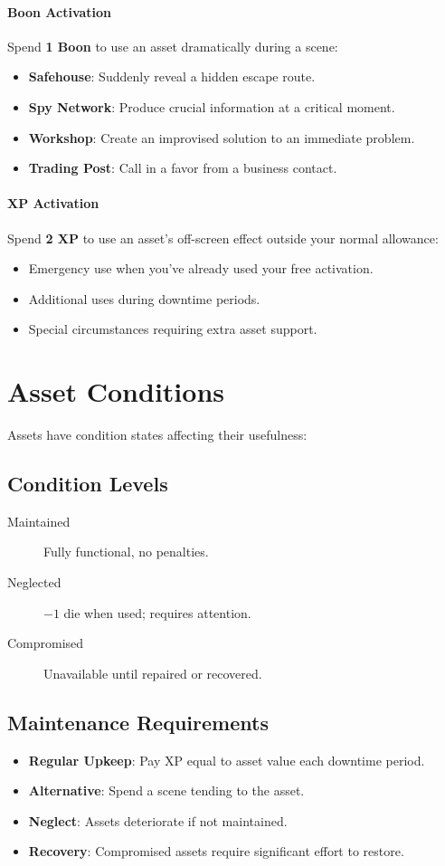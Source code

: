 \paragraph{Boon Activation}
Spend \textbf{1 Boon} to use an asset dramatically during a scene:
\begin{itemize}
\item \textbf{Safehouse}: Suddenly reveal a hidden escape route.
\item \textbf{Spy Network}: Produce crucial information at a critical moment.
\item \textbf{Workshop}: Create an improvised solution to an immediate problem.
\item \textbf{Trading Post}: Call in a favor from a business contact.
\end{itemize}

\paragraph{XP Activation}
Spend \textbf{2 XP} to use an asset's off-screen effect outside your normal allowance:
\begin{itemize}
\item Emergency use when you've already used your free activation.
\item Additional uses during downtime periods.
\item Special circumstances requiring extra asset support.
\end{itemize}

\section{Asset Conditions}

Assets have condition states affecting their usefulness:

\subsection*{Condition Levels}
\begin{description}
\item[Maintained] Fully functional, no penalties.
\item[Neglected] $-1$ die when used; requires attention.
\item[Compromised] Unavailable until repaired or recovered.
\end{description}

\subsection*{Maintenance Requirements}
\begin{itemize}
\item \textbf{Regular Upkeep}: Pay XP equal to asset value each downtime period.
\item \textbf{Alternative}: Spend a scene tending to the asset.
\item \textbf{Neglect}: Assets deteriorate if not maintained.
\item \textbf{Recovery}: Compromised assets require significant effort to restore.
\end{itemize}

